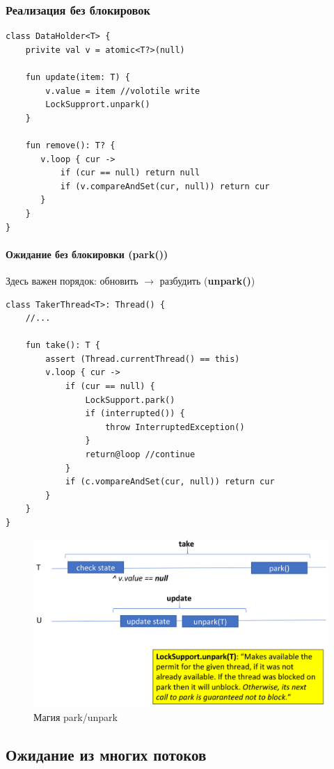 \documentclass[10pt,a4paper,oneside,titlepage]{article}
\theoremstyle{plain}
\theoremstyle{defenition}
\begin{document}
\subsubsection{Реализация без блокировок}

\begin{lstlisting}
class DataHolder<T> {
    privite val v = atomic<T?>(null)
    
    fun update(item: T) {
        v.value = item //volotile write
        LockSupprort.unpark()
    }
    
    fun remove(): T? {
       v.loop { cur -> 
           if (cur == null) return null
           if (v.compareAndSet(cur, null)) return cur
       }
    }
}
\end{lstlisting}

\paragraph{Ожидание без блокировки (park())}

Здесь важен порядок: обновить $\to$ разбудить ({\bfseries unpark()})

\begin{lstlisting}
class TakerThread<T>: Thread() {
    //...
    
    fun take(): T {
        assert (Thread.currentThread() == this) 
        v.loop { cur -> 
            if (cur == null) {
                LockSupport.park()
                if (interrupted()) {
                    throw InterruptedException()
                }
                return@loop //continue
            }
            if (c.vompareAndSet(cur, null)) return cur
        }
    }
}
\end{lstlisting}

\begin{figure}[h!]
	\centering
	\includegraphics[width=0.5\linewidth]{pictures/Park}
	\caption{Магия park/unpark}
	\label{fig:park}
\end{figure}

\subsection{Ожидание из многих потоков}
\end{document}
